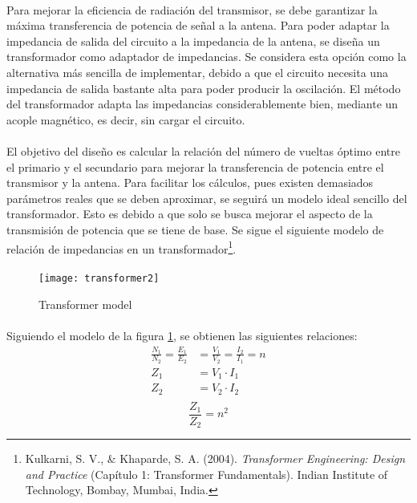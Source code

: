 \paragraph{}
Para mejorar la eficiencia de radiación del transmisor, se debe garantizar la máxima transferencia de potencia de señal a la antena.
Para poder adaptar la impedancia de salida del circuito a la impedancia de la antena, se diseña un transformador como adaptador de impedancias. 
Se considera esta opción como la alternativa más sencilla de implementar, debido a que el circuito necesita una impedancia de salida bastante alta para poder producir la oscilación.
El método del transformador adapta las impedancias considerablemente bien, mediante un acople magnético, es decir, sin cargar el circuito.
\paragraph{}
El objetivo del diseño es calcular la relación del número de vueltas óptimo entre el primario y el secundario para mejorar la transferencia de potencia entre el transmisor y la antena. 
Para facilitar los cálculos, pues existen demasiados parámetros reales que se deben aproximar, se seguirá un modelo ideal sencillo del transformador. Esto es debido a que solo se busca mejorar el aspecto de la transmisión de potencia que se tiene de base.
Se sigue el siguiente modelo de relación de impedancias en un transformador\footnote{Kulkarni, S. V., \& Khaparde, S. A. (2004). \textit{Transformer Engineering: Design and Practice} (Capítulo 1: Transformer Fundamentals). Indian Institute of Technology, Bombay, Mumbai, India.}.

\paragraph{}
\begin{figure}[h!]
    \centering
    \texttt{[image: transformer2]}
    \caption{Transformer model}
    \label{fig:transformer}
\end{figure}
\paragraph{}
Siguiendo el modelo de la figura \ref{fig:transformer}, se obtienen las siguientes relaciones:
\begin{align*}
   \frac{N_1}{N_2} = \frac{E_1}{E_2} &= \frac{V_1}{V_2} = \frac{I_2}{I_1} = n \\
   Z_1 &= V_1 \cdot I_1 \\
   Z_2 &= V_2 \cdot I_2 \\
\end{align*}
\begin{equation}
   \label{eq:transformer}
   \frac{Z_1}{Z_2} = n^2 
\end{equation}
